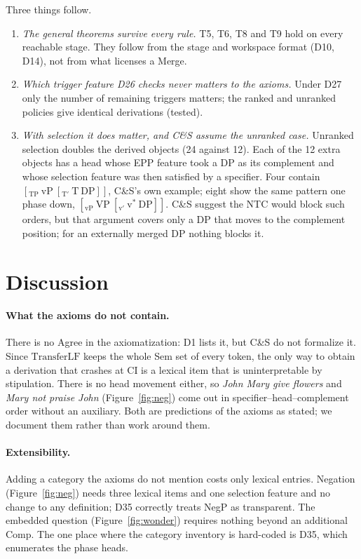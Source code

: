 \documentclass[11pt]{article}
\newcommand{\pf}[1]{\textit{#1}}
\newcommand{\Def}[1]{D#1}
\newcommand{\Thm}[1]{T#1}
\newcommand{\TLF}{\mathrm{TransferLF}}
\theoremstyle{definition}
\theoremstyle{plain}
\begin{document}
Three things follow.
\begin{enumerate}[leftmargin=*,itemsep=2pt]
\item \emph{The general theorems survive every rule.} \Thm{5}, \Thm{6},
  \Thm{8} and \Thm{9} hold on every reachable stage. They follow from the
  stage and workspace format (\Def{10}, \Def{14}), not from what licenses a
  Merge.
\item \emph{Which trigger feature \Def{26} checks never matters to the
  axioms.} Under \Def{27} only the number of remaining triggers matters; the
  ranked and unranked policies give identical derivations (tested).
\item \emph{With selection it does matter, and C\&S assume the unranked
  case.} Unranked selection doubles the derived objects (24 against 12).
  Each of the 12 extra objects has a head whose EPP feature took a DP as its
  complement and whose selection feature was then satisfied by a specifier.
  Four contain $[_{\mathrm{TP}}\ \mathrm{vP}\ [_{\mathrm{T'}}\ \mathrm{T}\
  \mathrm{DP}]]$, C\&S's own example; eight show the same pattern one phase
  down, $[_{\mathrm{vP}}\ \mathrm{VP}\ [_{\mathrm{v'}}\ \mathrm{v}^*\
  \mathrm{DP}]]$. C\&S suggest the NTC would block such orders, but that
  argument covers only a DP that moves to the complement position; for an
  externally merged DP nothing blocks it.
\end{enumerate}

\section{Discussion}
\label{sec:discussion}

\paragraph{What the axioms do not contain.}
There is no Agree in the axiomatization: \Def{1} lists it, but C\&S do not
formalize it. Since $\TLF$ keeps the whole Sem set of every token, the only
way to obtain a derivation that crashes at CI is a lexical item that is
uninterpretable by stipulation. There is no head movement either, so
\pf{John Mary give flowers} and \pf{Mary not praise John}
(Figure~\ref{fig:neg}) come out in specifier--head--complement order without
an auxiliary. Both are predictions of the axioms as stated; we document them
rather than work around them.

\paragraph{Extensibility.}
Adding a category the axioms do not mention costs only lexical entries.
Negation (Figure~\ref{fig:neg}) needs three lexical items and one selection
feature and no change to any definition; \Def{35} correctly treats NegP as
transparent. The embedded question (Figure~\ref{fig:wonder}) requires nothing
beyond an additional Comp. The one place where the category inventory is
hard-coded is \Def{35}, which enumerates the phase heads.
\end{document}
